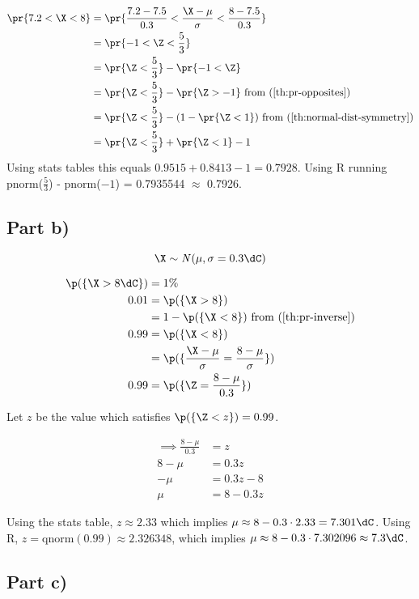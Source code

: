 \begin{align*}
\pr{7.2 < \X < 8} &= \pr{\frac{7.2 - 7.5}{0.3} < \frac{\X - \mu}{\sigma} < \frac{8 - 7.5}{0.3}} \\
&= \pr{-1 < \Z < \frac{5}{3}} \\
&= \pr{\Z < \frac{5}{3}} - \pr{-1 < \Z} \\
&= \pr{\Z < \frac{5}{3}} - \pr{\Z > -1}
\text{	from (\ref{th:pr-opposites})} \\
&= \pr{\Z < \frac{5}{3}} - (1 - \pr{\Z < 1})
\text{	from (\ref{th:normal-dist-symmetry})} \\
&= \pr{\Z < \frac{5}{3}} + \pr{\Z < 1} - 1
\end{align*}
Using stats tables this equals $0.9515 + 0.8413 - 1 = 0.7928$.
Using R running pnorm($\frac{5}{3}$) - pnorm($-1$) = 0.7935544 $\approx$ 0.7926.

\subsection{Part b)}

\[
\X \sim \mathit{N}(\mu, \sigma = 0.3 \dC)
\]

\begin{align*}
\p(\{ \X > 8\dC \}) &= 1\% \\
0.01 &= \p(\{ \X > 8 \}) \\
&= 1 - \p(\{ \X < 8 \})
\text{	from (\ref{th:pr-inverse})} \\
0.99 &= \p(\{ \X < 8 \}) \\
&= \p(\{ \frac{\X - \mu}{\sigma} = \frac{8 - \mu}{\sigma}\}) \\
0.99 &= \p(\{ \Z = \frac{8 - \mu}{0.3}\}) \\
\end{align*}

Let $z$ be the value which satisfies $\p(\{ \Z < z \}) = 0.99$.

\begin{align*}
\implies \frac{8 - \mu}{0.3} &= z \\
8 - \mu &= 0.3z \\
-\mu &= 0.3z - 8 \\
\mu &= 8 - 0.3z
\end{align*}

Using the stats table, $z \approx 2.33$ which implies $\mu \approx 8 - 0.3 \cdot 2.33 = 7.301\dC$.
Using R, $z = \text{qnorm}(0.99) \approx 2.326348$, which implies $\mu \approx 8 - 0.3 \cdot 7.302096 \approx 7.3\dC$.

\subsection{Part c)}

